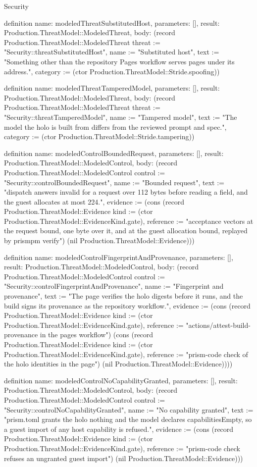 \begin{lexlean}{Security}
\begin{semanticmodule}
definition{
  name: modeledThreatSubstitutedHost,
  parameters: [],
  result: Production.ThreatModel::ModeledThreat,
  body: (record Production.ThreatModel::ModeledThreat {threat := "Security::threatSubstitutedHost", name := "Substituted host", text := "Something other than the repository Pages workflow serves pages under its address.", category := (ctor Production.ThreatModel::Stride.spoofing)})
}

definition{
  name: modeledThreatTamperedModel,
  parameters: [],
  result: Production.ThreatModel::ModeledThreat,
  body: (record Production.ThreatModel::ModeledThreat {threat := "Security::threatTamperedModel", name := "Tampered model", text := "The model the holo is built from differs from the reviewed prompt and spec.", category := (ctor Production.ThreatModel::Stride.tampering)})
}

definition{
  name: modeledControlBoundedRequest,
  parameters: [],
  result: Production.ThreatModel::ModeledControl,
  body: (record Production.ThreatModel::ModeledControl {control := "Security::controlBoundedRequest", name := "Bounded request", text := "dispatch answers invalid for a request over 112 bytes before reading a field, and the guest allocates at most 224.", evidence := (cons (record Production.ThreatModel::Evidence {kind := (ctor Production.ThreatModel::EvidenceKind.gate), reference := "acceptance vectors at the request bound, one byte over it, and at the guest allocation bound, replayed by prismpm verify"}) (nil Production.ThreatModel::Evidence))})
}

definition{
  name: modeledControlFingerprintAndProvenance,
  parameters: [],
  result: Production.ThreatModel::ModeledControl,
  body: (record Production.ThreatModel::ModeledControl {control := "Security::controlFingerprintAndProvenance", name := "Fingerprint and provenance", text := "The page verifies the holo digests before it runs, and the build signs its provenance as the repository workflow.", evidence := (cons (record Production.ThreatModel::Evidence {kind := (ctor Production.ThreatModel::EvidenceKind.gate), reference := "actions/attest-build-provenance in the pages workflow"}) (cons (record Production.ThreatModel::Evidence {kind := (ctor Production.ThreatModel::EvidenceKind.gate), reference := "prism-code check of the holo identities in the page"}) (nil Production.ThreatModel::Evidence)))})
}

definition{
  name: modeledControlNoCapabilityGranted,
  parameters: [],
  result: Production.ThreatModel::ModeledControl,
  body: (record Production.ThreatModel::ModeledControl {control := "Security::controlNoCapabilityGranted", name := "No capability granted", text := "prism.toml grants the holo nothing and the model declares capabilitiesEmpty, so a guest import of any host capability is refused.", evidence := (cons (record Production.ThreatModel::Evidence {kind := (ctor Production.ThreatModel::EvidenceKind.gate), reference := "prism-code check refuses an ungranted guest import"}) (nil Production.ThreatModel::Evidence))})
}


\end{semanticmodule}
\end{lexlean}
